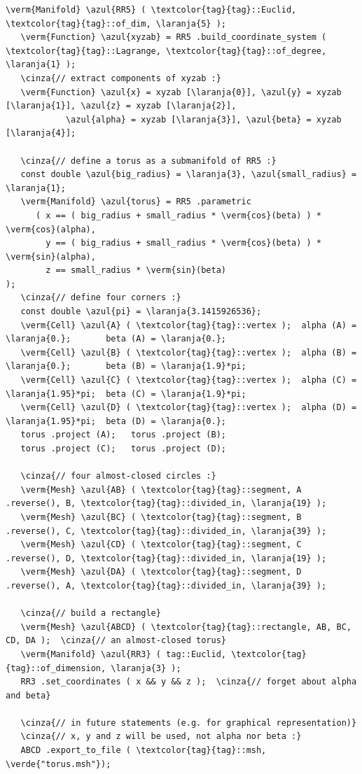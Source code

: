 \begin{Verbatim}[commandchars=\\\{\},formatcom=\small\tt,frame=single,
   label=parag-\ref{\numb section 2.\numb parag 21}.cpp,rulecolor=\color{moldura},
   baselinestretch=0.94,framesep=2mm]
   \verm{Manifold} \azul{RR5} ( \textcolor{tag}{tag}::Euclid, \textcolor{tag}{tag}::of_dim, \laranja{5} );
   \verm{Function} \azul{xyzab} = RR5 .build_coordinate_system ( \textcolor{tag}{tag}::Lagrange, \textcolor{tag}{tag}::of_degree, \laranja{1} );
   \cinza{// extract components of xyzab :}
   \verm{Function} \azul{x} = xyzab [\laranja{0}], \azul{y} = xyzab [\laranja{1}], \azul{z} = xyzab [\laranja{2}],
            \azul{alpha} = xyzab [\laranja{3}], \azul{beta} = xyzab [\laranja{4}];

   \cinza{// define a torus as a submanifold of RR5 :}
   const double \azul{big_radius} = \laranja{3}, \azul{small_radius} = \laranja{1};
   \verm{Manifold} \azul{torus} = RR5 .parametric
      ( x == ( big_radius + small_radius * \verm{cos}(beta) ) * \verm{cos}(alpha),
        y == ( big_radius + small_radius * \verm{cos}(beta) ) * \verm{sin}(alpha),
        z == small_radius * \verm{sin}(beta)                               );
   \cinza{// define four corners :}
   const double \azul{pi} = \laranja{3.1415926536};
   \verm{Cell} \azul{A} ( \textcolor{tag}{tag}::vertex );  alpha (A) = \laranja{0.};       beta (A) = \laranja{0.};
   \verm{Cell} \azul{B} ( \textcolor{tag}{tag}::vertex );  alpha (B) = \laranja{0.};       beta (B) = \laranja{1.9}*pi;
   \verm{Cell} \azul{C} ( \textcolor{tag}{tag}::vertex );  alpha (C) = \laranja{1.95}*pi;  beta (C) = \laranja{1.9}*pi;
   \verm{Cell} \azul{D} ( \textcolor{tag}{tag}::vertex );  alpha (D) = \laranja{1.95}*pi;  beta (D) = \laranja{0.};
   torus .project (A);   torus .project (B);
   torus .project (C);   torus .project (D);

   \cinza{// four almost-closed circles :}
   \verm{Mesh} \azul{AB} ( \textcolor{tag}{tag}::segment, A .reverse(), B, \textcolor{tag}{tag}::divided_in, \laranja{19} );
   \verm{Mesh} \azul{BC} ( \textcolor{tag}{tag}::segment, B .reverse(), C, \textcolor{tag}{tag}::divided_in, \laranja{39} );
   \verm{Mesh} \azul{CD} ( \textcolor{tag}{tag}::segment, C .reverse(), D, \textcolor{tag}{tag}::divided_in, \laranja{19} );
   \verm{Mesh} \azul{DA} ( \textcolor{tag}{tag}::segment, D .reverse(), A, \textcolor{tag}{tag}::divided_in, \laranja{39} );

   \cinza{// build a rectangle}
   \verm{Mesh} \azul{ABCD} ( \textcolor{tag}{tag}::rectangle, AB, BC, CD, DA );  \cinza{// an almost-closed torus}
   \verm{Manifold} \azul{RR3} ( tag::Euclid, \textcolor{tag}{tag}::of_dimension, \laranja{3} );
   RR3 .set_coordinates ( x && y && z );  \cinza{// forget about alpha and beta}

   \cinza{// in future statements (e.g. for graphical representation)}
   \cinza{// x, y and z will be used, not alpha nor beta :}
   ABCD .export_to_file ( \textcolor{tag}{tag}::msh, \verde{"torus.msh"});
\end{Verbatim}

